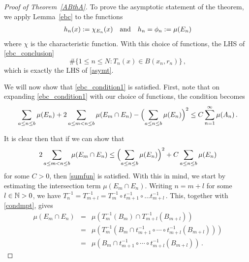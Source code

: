 \documentclass[11pt,reqno]{amsart}
\newcommand{\N}{{\Bbb N}}
\newcommand{\0}{\mathbf{0}}
\theoremstyle{remark}
\numberwithin{equation}{section}
\theoremstyle{remark}
\numberwithin{equation}{section}
\begin{document}
\begin{proof}[Proof of Theorem~\ref{ABthA}]
To prove the asymptotic statement of the theorem, we apply  Lemma~\ref{ebc} to the functions
\begin{eqnarray*}
h_n(x) := \chi_{E_n}(x)  \quad {\rm and } \quad 
h_n =\phi_n := \mu(E_n) 
\end{eqnarray*}
where $\chi$ is the characteristic function.
With this choice of functions, the LHS of \eqref{ebc_conclusion}  $$\#\{1\leq n \leq N: T_n(x) \in B(x_n,r_n)  \} \, ,$$ which is exactly the LHS of \eqref{asymt}.

We will now show that \eqref{ebc_condition1} is satisfied.
First, note that on expanding \eqref{ebc_condition1} with our choice of functions, the condition becomes
\begin{equation}\label{sumfun}
    \sum_{a \leq n \leq b} \mu(E_n) + 2\sum_{a \leq m < n \leq b} \mu(E_m \cap E_n)- \Bigl(\sum_{a \leq n \leq b}\mu(E_n)\Bigr )^2 \leq C\sum_{n=1}^\infty\mu(A_n) \, .
\end{equation}

It is clear then that if we can show that 
\begin{eqnarray}\label{sumfun1}
    2\sum_{a \leq m < n \leq b} \mu(E_m \cap E_n) \leq \Bigl(\sum_{a \leq n \leq b}\mu(E_n)\Bigr )^2  + C\sum_{a \leq n \leq b}\mu(E_n)
\end{eqnarray}
for some $C>0$, then \eqref{sumfun} is satisfied. With this in mind, we start by estimating the intersection term $\mu(E_m \cap E_n)$. Writing $n= m +l$ for some $l \in \N >0$, we have $T_{n}^{-1} = T_{m+l}^{-1} = T_m^{-1} \circ t_{m+1}^{-1} \circ \dots t_{m+l}^{-1} \, $. This, together with \eqref{condmpt}, gives
\begin{eqnarray*} \label{intbdb}
\mu(E_m \cap E_n) &=&
\mu(T_{m}^{-1}(B_m) \cap T_{m+l}^{-1}(B_{m+l})) \nonumber\\[2ex] &=& \mu\left(T_{m}^{-1}(B_m \cap t_{m+1}^{-1} \circ \cdots \circ t_{m+l}^{-1}(B_{m+l}))\right)  \nonumber \\[2ex] &=& \mu(B_m \cap t_{m+1}^{-1} \circ \cdots \circ t_{m+l}^{-1}(B_{m+l})) \, .

\end{eqnarray*}
\end{proof}
\end{document}
